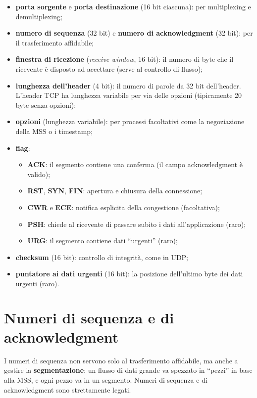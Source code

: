 \begin{itemize}
    \item \textbf{porta sorgente} e \textbf{porta destinazione} (16 bit ciascuna): per multiplexing e demultiplexing;
    \item \textbf{numero di sequenza} (32 bit) e \textbf{numero di acknowledgment} (32 bit): per il trasferimento affidabile;
    \item \textbf{finestra di ricezione} (\emph{receive window}, 16 bit): il numero di byte che il ricevente è
          disposto ad accettare (serve al controllo di flusso);
    \item \textbf{lunghezza dell'header} (4 bit): il numero di parole da 32 bit dell'header. L'header TCP ha
          lunghezza variabile per via delle opzioni (tipicamente 20 byte senza opzioni);
    \item \textbf{opzioni} (lunghezza variabile): per processi facoltativi come la negoziazione della MSS o i timestamp;
    \item \textbf{flag}:
    \begin{itemize}
      \item \textbf{ACK}: il segmento contiene una conferma (il campo acknowledgment è valido);
      \item \textbf{RST}, \textbf{SYN}, \textbf{FIN}: apertura e chiusura della connessione;
      \item \textbf{CWR} e \textbf{ECE}: notifica esplicita della congestione (facoltativa);
      \item \textbf{PSH}: chiede al ricevente di passare subito i dati all'applicazione (raro);
      \item \textbf{URG}: il segmento contiene dati ``urgenti'' (raro);
    \end{itemize}
    \item \textbf{checksum} (16 bit): controllo di integrità, come in UDP;
    \item \textbf{puntatore ai dati urgenti} (16 bit): la posizione dell'ultimo byte dei dati urgenti (raro).
\end{itemize}

\section{Numeri di sequenza e di acknowledgment}

I numeri di sequenza non servono solo al trasferimento affidabile, ma anche a gestire la
\textbf{segmentazione}: un flusso di dati grande va spezzato in ``pezzi'' in base alla MSS, e ogni pezzo va in un
segmento. Numeri di sequenza e di acknowledgment sono strettamente legati.

